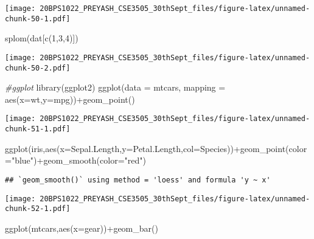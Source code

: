 \documentclass[
]{article}
\newenvironment{Shaded}{\begin{snugshade}}{\end{snugshade}}
\newcommand{\AttributeTok}[1]{\textcolor[rgb]{0.77,0.63,0.00}{#1}}
\newcommand{\CommentTok}[1]{\textcolor[rgb]{0.56,0.35,0.01}{\textit{#1}}}
\newcommand{\DecValTok}[1]{\textcolor[rgb]{0.00,0.00,0.81}{#1}}
\newcommand{\FunctionTok}[1]{\textcolor[rgb]{0.00,0.00,0.00}{#1}}
\newcommand{\NormalTok}[1]{#1}
\newcommand{\SpecialCharTok}[1]{\textcolor[rgb]{0.00,0.00,0.00}{#1}}
\newcommand{\StringTok}[1]{\textcolor[rgb]{0.31,0.60,0.02}{#1}}
\begin{document}
\texttt{[image: 20BPS1022\_PREYASH\_CSE3505\_30thSept\_files/figure-latex/unnamed-chunk-50-1.pdf]}

\begin{Shaded}
\begin{Highlighting}[]
\FunctionTok{splom}\NormalTok{(dat[}\FunctionTok{c}\NormalTok{(}\DecValTok{1}\NormalTok{,}\DecValTok{3}\NormalTok{,}\DecValTok{4}\NormalTok{)])}
\end{Highlighting}
\end{Shaded}

\texttt{[image: 20BPS1022\_PREYASH\_CSE3505\_30thSept\_files/figure-latex/unnamed-chunk-50-2.pdf]}

\begin{Shaded}
\begin{Highlighting}[]
\CommentTok{\#ggplot}
\FunctionTok{library}\NormalTok{(ggplot2)}
\FunctionTok{ggplot}\NormalTok{(}\AttributeTok{data =}\NormalTok{ mtcars,}
\AttributeTok{mapping =} \FunctionTok{aes}\NormalTok{(}\AttributeTok{x=}\NormalTok{wt,}\AttributeTok{y=}\NormalTok{mpg))}\SpecialCharTok{+}\FunctionTok{geom\_point}\NormalTok{()}
\end{Highlighting}
\end{Shaded}

\texttt{[image: 20BPS1022\_PREYASH\_CSE3505\_30thSept\_files/figure-latex/unnamed-chunk-51-1.pdf]}

\begin{Shaded}
\begin{Highlighting}[]
\FunctionTok{ggplot}\NormalTok{(iris,}\FunctionTok{aes}\NormalTok{(}\AttributeTok{x=}\NormalTok{Sepal.Length,}\AttributeTok{y=}\NormalTok{Petal.Length,}\AttributeTok{col=}\NormalTok{Species))}\SpecialCharTok{+}\FunctionTok{geom\_point}\NormalTok{(}\AttributeTok{color=}\StringTok{"blue"}\NormalTok{)}\SpecialCharTok{+}\FunctionTok{geom\_smooth}\NormalTok{(}\AttributeTok{color=}\StringTok{"red"}\NormalTok{)}
\end{Highlighting}
\end{Shaded}

\begin{verbatim}
## `geom_smooth()` using method = 'loess' and formula 'y ~ x'
\end{verbatim}

\texttt{[image: 20BPS1022\_PREYASH\_CSE3505\_30thSept\_files/figure-latex/unnamed-chunk-52-1.pdf]}

\begin{Shaded}
\begin{Highlighting}[]
\FunctionTok{ggplot}\NormalTok{(mtcars,}\FunctionTok{aes}\NormalTok{(}\AttributeTok{x=}\NormalTok{gear))}\SpecialCharTok{+}\FunctionTok{geom\_bar}\NormalTok{()}
\end{Highlighting}
\end{Shaded}
\end{document}
